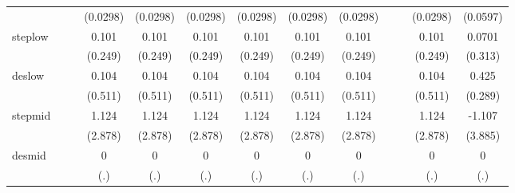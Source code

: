 {\begin{tabular}{l*{12}{c}}
            &                     &                     &    (0.0298)         &    (0.0298)         &    (0.0298)         &    (0.0298)         &    (0.0298)         &    (0.0298)         &                     &                     &    (0.0298)         &    (0.0597)         \\
[1em]
steplow     &                     &                     &       0.101         &       0.101         &       0.101         &       0.101         &       0.101         &       0.101         &                     &                     &       0.101         &      0.0701         \\
            &                     &                     &     (0.249)         &     (0.249)         &     (0.249)         &     (0.249)         &     (0.249)         &     (0.249)         &                     &                     &     (0.249)         &     (0.313)         \\
[1em]
deslow      &                     &                     &       0.104         &       0.104         &       0.104         &       0.104         &       0.104         &       0.104         &                     &                     &       0.104         &       0.425         \\
            &                     &                     &     (0.511)         &     (0.511)         &     (0.511)         &     (0.511)         &     (0.511)         &     (0.511)         &                     &                     &     (0.511)         &     (0.289)         \\
[1em]
stepmid     &                     &                     &       1.124         &       1.124         &       1.124         &       1.124         &       1.124         &       1.124         &                     &                     &       1.124         &      -1.107         \\
            &                     &                     &     (2.878)         &     (2.878)         &     (2.878)         &     (2.878)         &     (2.878)         &     (2.878)         &                     &                     &     (2.878)         &     (3.885)         \\
[1em]
desmid      &                     &                     &           0         &           0         &           0         &           0         &           0         &           0         &                     &                     &           0         &           0         \\
            &                     &                     &         (.)         &         (.)         &         (.)         &         (.)         &         (.)         &         (.)         &                     &                     &         (.)         &         (.)         \\

\end{tabular}}
